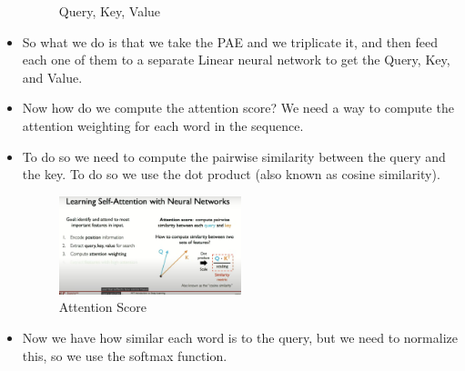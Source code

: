 \documentclass{article}
\begin{document}
\begin{itemize}
\begin{figure}
      \caption{Query, Key, Value}
    \end{figure}
    \item So what we do is that we take the PAE and we triplicate it, and then feed each one of them to a separate Linear neural network to get the  Query, Key, and Value. 
    \item Now how do we compute the attention score? We need a way to compute the attention weighting for each word in the sequence. 
    \item To do so we need to compute the pairwise similarity between the query and the key. To do so we use the dot product (also known as cosine similarity). 
    \begin{figure}[H]
      \centering
      \includegraphics[width = 0.5\textwidth]{Images/attention_score.png}
      \caption{Attention Score}
    \end{figure}
    \item Now we have how similar each word is to the query, but we need to normalize this, so we use the softmax function. 
    

\end{itemize}
\end{document}
